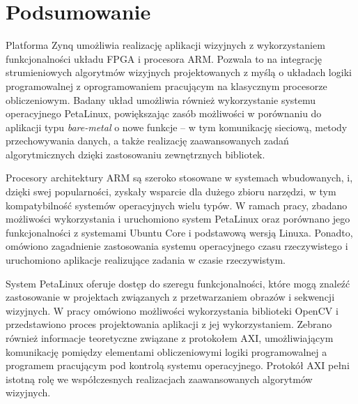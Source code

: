 \chapter{Podsumowanie}
\label{chap:summary}


Platforma Zynq umożliwia realizację aplikacji wizyjnych z wykorzystaniem funkcjonalności układu FPGA i procesora ARM. Pozwala to na integrację strumieniowych algorytmów wizyjnych projektowanych z myślą o układach logiki programowalnej z oprogramowaniem pracującym na klasycznym procesorze obliczeniowym. Badany układ umożliwia również wykorzystanie systemu operacyjnego PetaLinux, powiększając zasób możliwości w porównaniu do aplikacji typu \emph{bare-metal} o nowe funkcje -- w tym komunikację sieciową, metody przechowywania danych, a także realizację zaawansowanych zadań algorytmicznych dzięki zastosowaniu zewnętrznych bibliotek. 

Procesory architektury ARM  są szeroko stosowane w systemach wbudowanych, i, dzięki swej popularności, zyskały wsparcie dla dużego zbioru narzędzi, w tym kompatybilność systemów operacyjnych wielu typów. W ramach pracy, zbadano możliwości wykorzystania i uruchomiono system PetaLinux oraz porównano jego funkcjonalności z systemami Ubuntu Core i podstawową wersją Linuxa. Ponadto, omówiono zagadnienie zastosowania systemu operacyjnego czasu rzeczywistego i uruchomiono aplikacje realizujące zadania w czasie rzeczywistym.

System PetaLinux oferuje dostęp do szeregu funkcjonalności, które mogą znaleźć zastosowanie w projektach związanych z przetwarzaniem obrazów i sekwencji wizyjnych. W pracy omówiono możliwości wykorzystania biblioteki OpenCV i przedstawiono proces projektowania aplikacji z jej wykorzystaniem. Zebrano również informacje teoretyczne związane z protokołem AXI, umożliwiającym komunikację pomiędzy elementami obliczeniowymi logiki programowalnej a programem pracującym pod kontrolą systemu operacyjnego. Protokół AXI pełni istotną rolę we współczesnych realizacjach zaawansowanych algorytmów wizyjnych.

